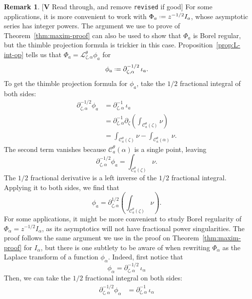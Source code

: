 \documentclass{article}
\newcommand{\fracderiv}[3]{\partial^{#1}_{#2, #3}}
\newcommand*{\defeq}{\mathrel{\vcenter{\baselineskip0.5ex \lineskiplimit0pt
                     \hbox{\scriptsize.}\hbox{\scriptsize.}}}%
                     =}
\newcommand{\laplace}{\mathcal{L}}
\theoremstyle{definition}
\newtheorem{remark}[definition]{Remark}
\theoremstyle{plain}
\newenvironment{todo}{\color{Coral}}{\color{black}}
\newenvironment{old}{\color{RoyalBlue}}{\color{black}}
\newenvironment{revised}{\color{DarkBlue}}{\color{black}}
\begin{document}
\begin{remark}\label{rmk:1/2-deriv}
\begin{todo}[\textbf{V} Read through, and remove \texttt{revised} if good]\end{todo}\begin{revised}
For some applications, it is more convenient to work with $\Phi_a \defeq z^{-1/2} I_a$, whose asymptotic series has integer powers. The argument we use to prove of Theorem~\ref{thm:maxim-proof} can also be used to show that $\Phi_a$ is Borel regular, but the thimble projection formula is trickier in this case. Proposition~\ref{prop:L-int-op} tells us that $\Phi_a = \laplace^\theta_{\zeta, \alpha} \phi_a$ for
\[\phi_a \defeq \fracderiv{-1/2}{\zeta}{\alpha}\,\iota_a. \]
To get the thimble projection formula for $\phi_a$, take the $1/2$ fractional integral of both sides:
\begin{align*}
    \fracderiv{-1/2}{\zeta}{\alpha} \phi_a & = \fracderiv{-1}{\zeta}{\alpha} \, \iota_a \\
    & = \fracderiv{-1}{\zeta}{\alpha} \partial_\zeta \left( \int_{\mathcal{C}_a^\theta(\zeta)}\nu \right) \\
    & = \int_{\mathcal{C}_a^\theta(\zeta)}\nu - \int_{\mathcal{C}_a^\theta(\alpha)}\nu.
\end{align*}
The second term vanishes because $\mathcal{C}_a^\theta(\alpha)$ is a single point, leaving
\[ \fracderiv{-1/2}{\zeta}{\alpha} \phi_a = \int_{\mathcal{C}_a^\theta(\zeta)}\nu. \]
The $1/2$ fractional derivative is a left inverse of the $1/2$ fractional integral. Applying it to both sides, we find that
\begin{equation}\label{eqn:formula--1/2} \phi_a = \fracderiv{1/2}{\zeta}{\alpha} \left( \int_{\mathcal{C}_a^\theta(\zeta)}\nu \right).\end{equation}
\end{revised}
\begin{old}
For some applications, it might be more convenient to study Borel regularity of $\Phi_\alpha=z^{-1/2}I_\alpha$, as its asymptotics will not have fractional power singularities. The proof follows the same argument we use in the proof on Theorem~\ref{thm:maxim-proof} for $I_\alpha$, but there is one subtlety to be aware of when rewriting $\Phi_\alpha$ as the Laplace transform of a function $\phi_\alpha$. Indeed, first notice that \[\phi_\alpha = \fracderiv{-1/2}{\zeta}{\alpha}\,\iota_\alpha \]
Then, we can take the $1/2$ fractional integral on both sides:
\begin{align*}
    \fracderiv{-1/2}{\zeta}{\alpha} \phi_\alpha &= \fracderiv{-1}{\zeta}{\alpha} \, \iota_\alpha \\

\end{align*}
\end{old}
\end{remark}
\end{document}
